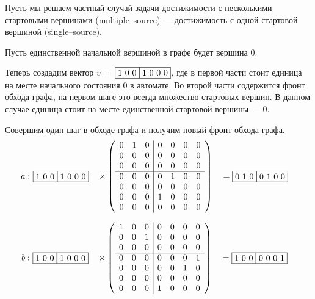 \begin{example}
Пусть мы решаем частный случай задачи достижимости с несколькими стартовыми вершинами (multiple--source) 
--- достижимость с одной стартовой вершиной (single--source).

Пусть единственной начальной вершиной в графе будет вершина $0$.

Теперь создадим вектор $v = $ $\fbox{1 0 0} \fbox{1 0 0 0}$, где в первой части стоит единица на месте начального состояния $0$ в автомате. 
Во второй части содержится фронт обхода графа, на первом шаге это всегда множество стартовых вершин. В данном случае единица стоит на месте
единственной стартовой вершины --- $0$.

Совершим один шаг в обходе графа и получим новый фронт обхода графа.
\begin{alignat*}{7}
  a:\,\,
  & \begin{matrix}
    \fbox{1 0 0} \fbox{1 0 0 0}
    \end{matrix} &&
    \times
    \left(\begin{array}{c c c | c c c c}
    0 & 1 & 0 & 0 & 0 & 0 & 0 \\
    0 & 0 & 0 & 0 & 0 & 0 & 0 \\
    0 & 0 & 0 & 0 & 0 & 0 & 0 \\
    \hline
    0 & 0 & 0 & 0 & 1 & 0 & 0 \\
    0 & 0 & 0 & 0 & 0 & 0 & 0 \\
    0 & 0 & 0 & 1 & 0 & 0 & 0 \\
    0 & 0 & 0 & 0 & 0 & 0 & 0 
    \end{array}\right)
    &&= \begin{matrix}
        \fbox{0 1 0} \fbox{0 1 0 0} 
    \end{matrix}
\end{alignat*}

\begin{alignat*}{7}
  b:\,\,
  & \begin{matrix}
    \fbox{1 0 0} \fbox{1 0 0 0}
    \end{matrix}  &&
    \times
    \left(\begin{array}{c c c | c c c c}
      1 & 0 & 0 & 0 & 0 & 0 & 0 \\
      0 & 0 & 1 & 0 & 0 & 0 & 0 \\
      0 & 0 & 0 & 0 & 0 & 0 & 0 \\
      \hline
      0 & 0 & 0 & 0 & 0 & 0 & 1 \\
      0 & 0 & 0 & 0 & 0 & 1 & 0 \\
      0 & 0 & 0 & 0 & 0 & 0 & 0 \\
      0 & 0 & 0 & 1 & 0 & 0 & 0 
      \end{array}\right)
    &&= \begin{matrix}
        \fbox{1 0 0} \fbox{0 0 0 1}
    \end{matrix}
\end{alignat*}


\end{example}
